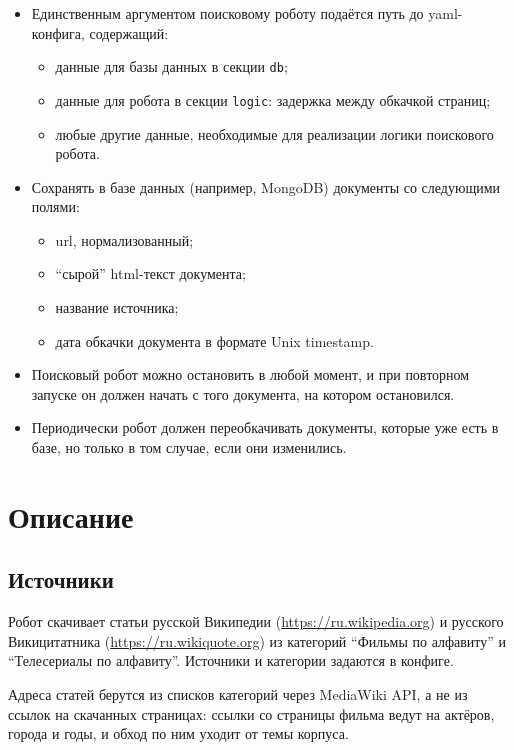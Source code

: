 \documentclass[12pt,a4paper,oneside,fleqn]{article}
\begin{document}
\begin{itemize}
    \item Единственным аргументом поисковому роботу подаётся путь до yaml-конфига, содержащий:
    \begin{itemize}
        \item данные для базы данных в секции \texttt{db};
        \item данные для робота в секции \texttt{logic}: задержка между обкачкой страниц;
        \item любые другие данные, необходимые для реализации логики поискового робота.
    \end{itemize}
    \item Сохранять в базе данных (например, MongoDB) документы со следующими полями:
    \begin{itemize}
        \item url, нормализованный;
        \item \enquote{сырой} html-текст документа;
        \item название источника;
        \item дата обкачки документа в формате Unix timestamp.
    \end{itemize}
    \item Поисковый робот можно остановить в любой момент, и при повторном запуске он должен начать с того документа, на котором остановился.
    \item Периодически робот должен переобкачивать документы, которые уже есть в базе, но только в том случае, если они изменились.
\end{itemize}

\pagebreak

\section{Описание}

\subsection{Источники}

Робот скачивает статьи русской Википедии (\url{https://ru.wikipedia.org}) и русского Викицитатника (\url{https://ru.wikiquote.org}) из категорий \enquote{Фильмы по алфавиту} и \enquote{Телесериалы по алфавиту}. Источники и категории задаются в конфиге.

Адреса статей берутся из списков категорий через MediaWiki API, а не из ссылок на скачанных страницах: ссылки со страницы фильма ведут на актёров, города и годы, и обход по ним уходит от темы корпуса.
\end{document}

